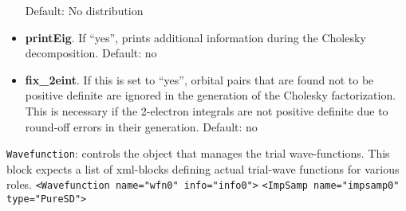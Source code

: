 \begin{itemize}
    Default: No distribution
\item \textbf{printEig}. If ``yes'', prints additional information during the Cholesky decomposition.
    Default: no
\item \textbf{fix\_2eint}.  If this is set to ``yes'', orbital pairs that are found not to be positive definite are ignored in the generation of the Cholesky factorization. This is necessary if the 2-electron integrals are not positive definite due to round-off errors in their generation.
    Default: no \\
\end{itemize}

\texttt{Wavefunction}: controls the object that manages the trial wave-functions. This block expects a list of xml-blocks defining actual trial-wave functions for various roles. 
\texttt{<Wavefunction name="wfn0" info="info0">}
  \texttt{<ImpSamp name="impsamp0" type="PureSD">}
